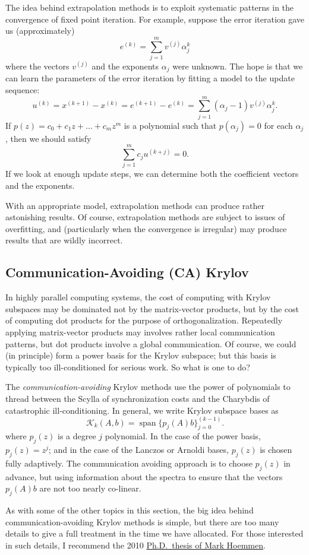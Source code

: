 \documentclass[12pt, leqno]{article} %
\begin{document}
The idea behind extrapolation methods is to exploit systematic patterns
in the convergence of fixed point iteration.  For example, suppose the
error iteration gave us (approximately)
\[
  e^{(k)} = \sum_{j=1}^m v^{(j)} \alpha_j^k
\]
where the vectors $v^{(j)}$ and the exponents $\alpha_j$ were unknown.
The hope is that we can learn the parameters of the error iteration
by fitting a model to the update sequence:
\[
  u^{(k)} = x^{(k+1)}-x^{(k)} = e^{(k+1)}-e^{(k)} =
  \sum_{j=1}^m (\alpha_j-1) v^{(j)} \alpha_j^k.
\]
If $p(z) = c_0 + c_1 z + \ldots + c_m z^m$ is a polynomial such
that $p(\alpha_j) = 0$ for each $\alpha_j$, then we should satisfy
\[
  \sum_{j=1}^m c_j u^{(k+j)} = 0.
\]
If we look at enough update steps, we can determine both the
coefficient vectors and the exponents.

With an appropriate model, extrapolation methods can produce rather
astonishing results.  Of course, extrapolation methods are subject
to issues of overfitting, and (particularly when the convergence is
irregular) may produce results that are wildly incorrect.

\subsection{Communication-Avoiding (CA) Krylov}

In highly parallel computing systems, the cost of computing with Krylov
subspaces may be dominated not by the matrix-vector products, but by the
cost of computing dot products for the purpose of orthogonalization.
Repeatedly applying matrix-vector products may involves rather local
communication patterns, but dot products involve a global communication.
Of course, we could (in principle) form a power basis for the Krylov
subspace; but this basis is typically too ill-conditioned for serious
work.  So what is one to do?

The {\em communication-avoiding} Krylov methods use the power of
polynomials to thread between the Scylla of synchronization costs and
the Charybdis of catastrophic ill-conditioning.  In general, we write
Krylov subspace bases as
\[
  \mathcal{K}_k(A,b) = \operatorname{span}\{ p_j(A) b \}_{j=0}^{(k-1)}.
\]
where $p_j(z)$ is a degree $j$ polynomial.  In the case of the
power basis, $p_j(z) = z^j$; and in the case of the Lanczos or
Arnoldi bases, $p_j(z)$ is chosen fully adaptively.  The communication
avoiding approach is to choose $p_j(z)$ in advance, but using information
about the spectra to ensure that the vectors $p_j(A) b$ are not too
nearly co-linear.

As with some of the other topics in this section, the big idea behind
communication-avoiding Krylov methods is simple, but there are too many
details to give a full treatment in the time we have allocated.  For
those interested in such details, I recommend the 2010 \href{https://www2.eecs.berkeley.edu/Pubs/TechRpts/2010/EECS-2010-37.pdf}{Ph.D.~thesis of
Mark Hoemmen}.
\end{document}
